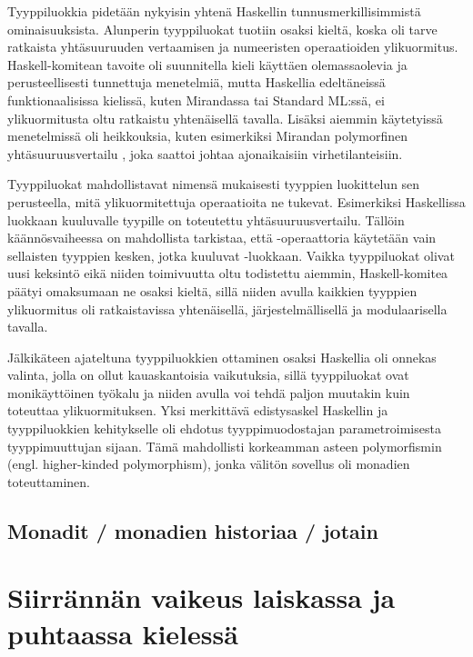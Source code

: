\documentclass[finnish]{tktltiki2}
\begin{document}
Tyyppiluokkia pidetään nykyisin yhtenä Haskellin tunnusmerkillisimmistä ominaisuuksista. Alunperin
tyyppiluokat tuotiin osaksi kieltä, koska oli tarve ratkaista yhtäsuuruuden vertaamisen ja
numeeristen operaatioiden ylikuormitus. Haskell-komitean tavoite oli suunnitella kieli käyttäen
olemassaolevia ja perusteellisesti tunnettuja menetelmiä, mutta Haskellia edeltäneissä
funktionaalisissa kielissä, kuten Mirandassa tai Standard ML:ssä, ei ylikuormitusta oltu ratkaistu
yhtenäisellä tavalla. Lisäksi aiemmin käytetyissä menetelmissä oli heikkouksia, kuten esimerkiksi
Mirandan polymorfinen yhtäsuuruusvertailu , joka saattoi johtaa ajonaikaisiin
virhetilanteisiin.

Tyyppiluokat mahdollistavat nimensä mukaisesti tyyppien luokittelun sen perusteella, mitä
ylikuormitettuja operaatioita ne tukevat. Esimerkiksi Haskellissa luokkaan  kuuluvalle
tyypille on toteutettu yhtäsuuruusvertailu. Tällöin käännösvaiheessa on mahdollista tarkistaa, että
\code{==}-operaattoria käytetään vain sellaisten tyyppien kesken, jotka kuuluvat
-luokkaan. Vaikka tyyppiluokat olivat uusi keksintö eikä niiden toimivuutta oltu
todistettu aiemmin, Haskell-komitea päätyi omaksumaan ne osaksi kieltä, sillä niiden avulla kaikkien
tyyppien ylikuormitus oli ratkaistavissa yhtenäisellä, järjestelmällisellä ja modulaarisella
tavalla.

 Jälkikäteen ajateltuna tyyppiluokkien ottaminen osaksi Haskellia oli onnekas valinta,
jolla on ollut kauaskantoisia vaikutuksia, sillä tyyppiluokat ovat monikäyttöinen työkalu ja niiden
avulla voi tehdä paljon muutakin kuin toteuttaa ylikuormituksen. Yksi merkittävä edistysaskel
Haskellin ja tyyppiluokkien kehitykselle oli ehdotus tyyppimuodostajan parametroimisesta
tyyppimuuttujan sijaan. Tämä mahdollisti korkeamman asteen polymorfismin (engl. higher-kinded
polymorphism), jonka välitön sovellus oli monadien toteuttaminen.

\subsection{Monadit / monadien historiaa / jotain}


\section{Siirrännän vaikeus laiskassa ja puhtaassa kielessä}

\end{document}
